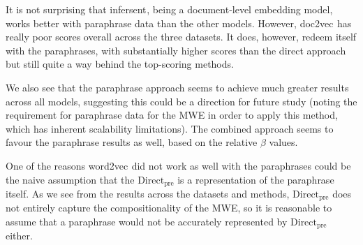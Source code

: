 \documentclass[11pt,a4paper]{article}
\newcommand{\embmethod}[2][]{\textsf{#2}$_{\text{#1}}$\xspace}
\newcommand{\wordtovec}{\embmethod{word2vec}}
\newcommand{\infersent}[1][]{\embmethod[#1]{infersent}}
\newcommand{\doctovec}{\embmethod{doc2vec}}
\newcommand{\method}[2][]{\ensuremath{\text{#2}_{\text{#1}}}\xspace}
\newcommand{\presum}{\method[pre]{Direct}}
\begin{document}



It is not surprising that \infersent, being a document-level embedding model, works better with paraphrase data than the other models. However, \doctovec has really poor scores overall across the three datasets. It does, however, redeem itself with the paraphrases, with substantially higher scores than the direct approach but still quite a way behind the top-scoring methods. 

We also see that the paraphrase approach seems to achieve much greater results across all models, suggesting this could be a direction for future study (noting the requirement for paraphrase data for the MWE in order to apply this method, which has inherent scalability limitations). The combined approach seems to favour the paraphrase results as well, based on the relative $\beta$ values.

One of the reasons \wordtovec did not work as well with the paraphrases could be the naive assumption that the \presum is a representation of the paraphrase itself. As we see from the results across the datasets and methods, \presum does not entirely capture the compositionality of the MWE, so it is reasonable to assume that a paraphrase would not be accurately represented by  \presum either. 
\end{document}
